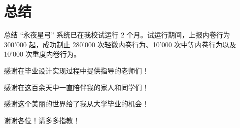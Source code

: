 %
%
% 
%
\section{总结}
    \begin{frame}{总结}
        “永夜星弓” 系统已在我校试运行 2 个月。试运行期间，上报内卷行为 300'000 起，成功制止 280'000 次轻微内卷行为、10'000 次中等内卷行为以及 10'000 次重度内卷行为。
        
        \begin{center}
            感谢在毕业设计实现过程中提供指导的老师们！
            
            感谢在这百余天中一直陪伴我的家人和同学们！
            
            感谢这个美丽的世界给了我从大学毕业的机会！
        \end{center}
        
        \begin{center}
            谢谢各位！请多多指教！
        \end{center}
    \end{frame}